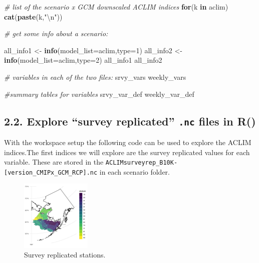 \documentclass[
]{article}
\newenvironment{Shaded}{\begin{snugshade}}{\end{snugshade}}
\newcommand{\CharTok}[1]{\textcolor[rgb]{0.31,0.60,0.02}{#1}}
\newcommand{\CommentTok}[1]{\textcolor[rgb]{0.56,0.35,0.01}{\textit{#1}}}
\newcommand{\ControlFlowTok}[1]{\textcolor[rgb]{0.13,0.29,0.53}{\textbf{#1}}}
\newcommand{\DataTypeTok}[1]{\textcolor[rgb]{0.13,0.29,0.53}{#1}}
\newcommand{\DecValTok}[1]{\textcolor[rgb]{0.00,0.00,0.81}{#1}}
\newcommand{\KeywordTok}[1]{\textcolor[rgb]{0.13,0.29,0.53}{\textbf{#1}}}
\newcommand{\NormalTok}[1]{#1}
\newcommand{\StringTok}[1]{\textcolor[rgb]{0.31,0.60,0.02}{#1}}
\begin{document}
\begin{Shaded}
\begin{Highlighting}[]
    \CommentTok{# list of the scenario x GCM downscaled ACLIM indices}
    \ControlFlowTok{for}\NormalTok{(k }\ControlFlowTok{in}\NormalTok{ aclim)}
     \KeywordTok{cat}\NormalTok{(}\KeywordTok{paste}\NormalTok{(k,}\StringTok{"}\CharTok{\textbackslash{}n}\StringTok{"}\NormalTok{))}
  
    \CommentTok{# get some info about a scenario:}
  
\NormalTok{    all_info1 <-}\StringTok{ }\KeywordTok{info}\NormalTok{(}\DataTypeTok{model_list=}\NormalTok{aclim,}\DataTypeTok{type=}\DecValTok{1}\NormalTok{)}
\NormalTok{    all_info2 <-}\StringTok{ }\KeywordTok{info}\NormalTok{(}\DataTypeTok{model_list=}\NormalTok{aclim,}\DataTypeTok{type=}\DecValTok{2}\NormalTok{)}
\NormalTok{    all_info1}
\NormalTok{    all_info2}
   
    \CommentTok{# variables in each of the two files:}
\NormalTok{    srvy_vars}
\NormalTok{    weekly_vars}
  
    \CommentTok{#summary tables for variables}
\NormalTok{    srvy_var_def}
\NormalTok{    weekly_var_def}
\end{Highlighting}
\end{Shaded}

\hypertarget{explore-survey-replicated-.nc-files-in-r}{%
\subsection{\texorpdfstring{2.2. Explore ``survey replicated''
\texttt{.nc} files in
R()}{2.2. Explore ``survey replicated'' .nc files in R()}}\label{explore-survey-replicated-.nc-files-in-r}}

With the workspace setup the following code can be used to explore the
ACLIM indices.The first indices we will explore are the survey
replicated values for each variable. These are stored in the
\texttt{ACLIMsurveyrep\_B10K-{[}version\_CMIPx\_GCM\_RCP{]}.nc} in each
scenario folder.

\begin{figure}
\centering
\includegraphics[width=0.3\textwidth,height=\textheight]{Figs/stations.jpg}
\caption{Survey replicated stations.}
\end{figure}
\end{document}

